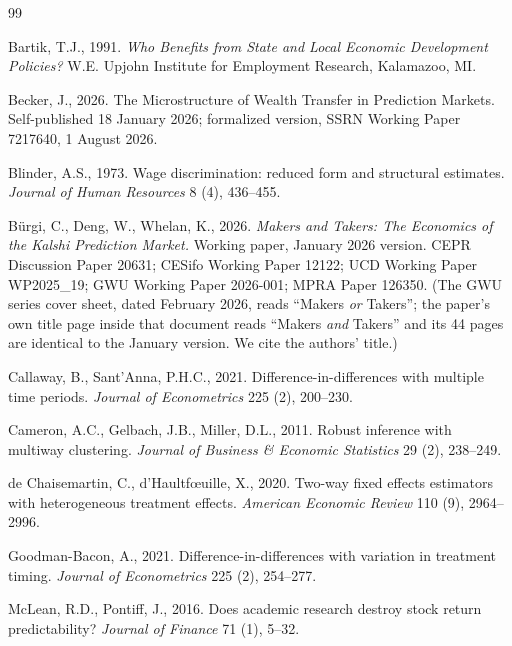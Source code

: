 \documentclass[preprint,12pt,authoryear]{elsarticle}
\begin{document}
\begin{thebibliography}{99}

Bartik, T.J., 1991.
\emph{Who Benefits from State and Local Economic Development Policies?}
W.E. Upjohn Institute for Employment Research, Kalamazoo, MI.

Becker, J., 2026.
The Microstructure of Wealth Transfer in Prediction Markets.
Self-published 18 January 2026; formalized version, SSRN Working Paper 7217640,
1 August 2026.

Blinder, A.S., 1973.
Wage discrimination: reduced form and structural estimates.
\emph{Journal of Human Resources} 8 (4), 436--455.

B\"urgi, C., Deng, W., Whelan, K., 2026.
\emph{Makers and Takers: The Economics of the Kalshi Prediction Market.}
Working paper, January 2026 version. CEPR Discussion Paper 20631; CESifo Working
Paper 12122; UCD Working Paper WP2025\_19; GWU Working Paper 2026-001; MPRA
Paper 126350. (The GWU series cover sheet, dated February 2026, reads ``Makers
\emph{or} Takers''; the paper's own title page inside that document reads
``Makers \emph{and} Takers'' and its 44 pages are identical to the January
version. We cite the authors' title.)

Callaway, B., Sant'Anna, P.H.C., 2021.
Difference-in-differences with multiple time periods.
\emph{Journal of Econometrics} 225 (2), 200--230.

Cameron, A.C., Gelbach, J.B., Miller, D.L., 2011.
Robust inference with multiway clustering.
\emph{Journal of Business \& Economic Statistics} 29 (2), 238--249.

de Chaisemartin, C., d'Haultf{\oe}uille, X., 2020.
Two-way fixed effects estimators with heterogeneous treatment effects.
\emph{American Economic Review} 110 (9), 2964--2996.

Goodman-Bacon, A., 2021.
Difference-in-differences with variation in treatment timing.
\emph{Journal of Econometrics} 225 (2), 254--277.

McLean, R.D., Pontiff, J., 2016.
Does academic research destroy stock return predictability?
\emph{Journal of Finance} 71 (1), 5--32.


\end{thebibliography}
\end{document}
